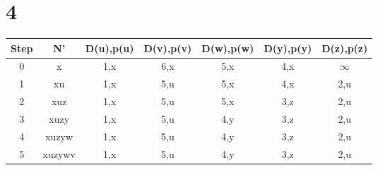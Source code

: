 \section*{4}

\begin{center}
    \begin{tabular}{|c|c|c|c|c|c|c|}
        \hline
        \textbf{Step} & \textbf{N'} & \textbf{D(u),p(u)} & \textbf{D(v),p(v)} & \textbf{D(w),p(w)} & \textbf{D(y),p(y)} & \textbf{D(z),p(z)} \\ 
        \hline
        0 & x & 1,x & 6,x & 5,x & 4,x & $\infty$ \\  
        \hline
        1 & xu & 1,x & 5,u & 5,x & 4,x & 2,u \\  
        \hline
        2 & xuz & 1,x & 5,u & 5,x & 3,z & 2,u \\  
        \hline
        3 & xuzy & 1,x & 5,u & 4,y & 3,z & 2,u \\  
        \hline
        4 & xuzyw & 1,x & 5,u & 4,y & 3,z & 2,u \\  
        \hline
        5 & xuzywv & 1,x & 5,u & 4,y & 3,z & 2,u \\  
        \hline
    \end{tabular}
\end{center}

